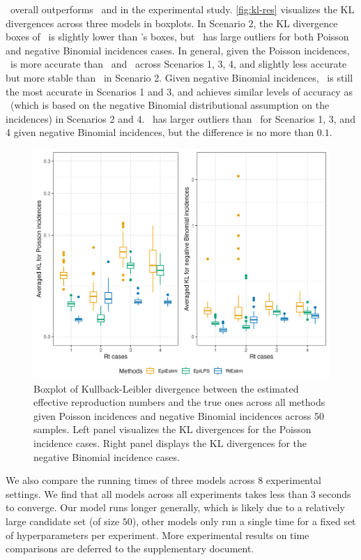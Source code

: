 \RtEstim\ overall outperforms \EpiEstim\ and \EpiLPS in the experimental study. \autoref{fig:kl-res} visualizes the KL divergences across three models in boxplots. In Scenario 2, the KL divergence boxes of \EpiLPS\ is slightly lower than \RtEstim's boxes, but \EpiLPS\ has large outliers for both Poisson and negative Binomial incidences cases. In general, given the Poisson incidences, \RtEstim\ is more accurate than \EpiEstim\ and \EpiLPS\ across Scenarios 1, 3, 4, and slightly less accurate but more stable than \EpiLPS\ in Scenario 2. Given negative Binomial incidences, \RtEstim\ is still the most accurate in Scenarios 1 and 3, and achieves similar levels of accuracy as \EpiLPS\ (which is based on the negative Binomial distributional assumption on the incidences) in Scenarios 2 and 4. \RtEstim\ has larger outliers than \EpiLPS\ for Scenarios 1, 3, and 4 given negative Binomial incidences, but the difference is no more than $0.1$. 
\begin{figure}[htb]
    \centering
    \includegraphics*[width=160mm]{fig/kl.png}
    \caption{Boxplot of Kullback-Leibler divergence between the estimated effective reproduction numbers and the true ones across all methods given Poisson incidences and negative Binomial incidences across 50 samples. Left panel visualizes the KL divergences for the Poisson incidence cases. Right panel displays the KL divergences for the negative Binomial incidence cases.} 
    \label{fig:kl-res}
\end{figure}

We also compare the running times of three models across $8$ experimental settings. We find that all models across all experiments takes less than $3$ seconds to converge. Our model runs longer generally, which is likely due to a relatively large candidate set (of size $50$), other models only run a single time for a fixed set of hyperparameters per experiment. 
More experimental results on time comparisons are deferred to the supplementary document. 


